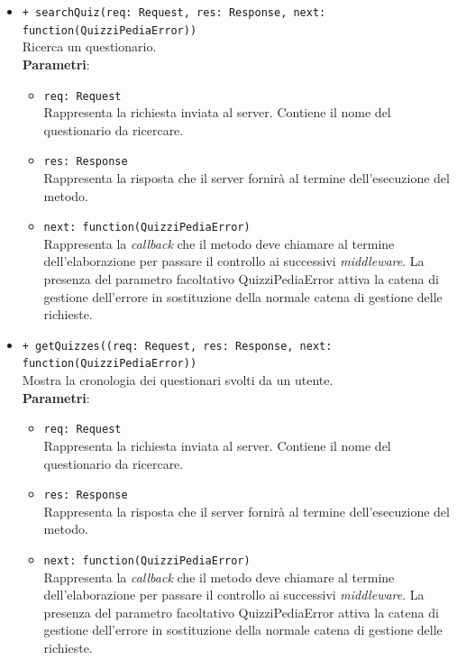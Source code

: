 \begin{itemize}
\begin{itemize}
		\item \texttt{+ searchQuiz(req: Request, res: Response, next: function(QuizziPediaError))}\\
		Ricerca un questionario.\\
		\textbf{Parametri}:
		\begin{itemize}
			\item \texttt{req: Request}\\
			Rappresenta la richiesta inviata al server. Contiene il nome del questionario da ricercare.
			\item \texttt{res: Response}\\
			Rappresenta la risposta che il server fornirà al termine dell'esecuzione del metodo.
			\item \texttt{next: function(QuizziPediaError)}\\
			Rappresenta la \textit{callback} che il metodo deve chiamare al termine dell'elaborazione per passare il controllo ai successivi \textit{middleware}. La presenza del parametro facoltativo QuizziPediaError attiva la catena di gestione dell'errore in sostituzione della normale catena di gestione delle richieste.
		\end{itemize}
		
		\item \texttt{+ getQuizzes((req: Request, res: Response, next: function(QuizziPediaError))}\\
			Mostra la cronologia dei questionari svolti da un utente.\\
			\textbf{Parametri}:
			\begin{itemize}
				\item \texttt{req: Request}\\
			Rappresenta la richiesta inviata al server. Contiene il nome del questionario da ricercare.
				\item \texttt{res: Response}\\
			Rappresenta la risposta che il server fornirà al termine dell'esecuzione del metodo.
				\item \texttt{next: function(QuizziPediaError)}\\
			Rappresenta la \textit{callback} che il metodo deve chiamare al termine dell'elaborazione per passare il controllo ai successivi \textit{middleware}. La presenza del parametro facoltativo QuizziPediaError attiva la catena di gestione dell'errore in sostituzione della normale catena di gestione delle richieste.
			\end{itemize}
		
	\end{itemize}		
\end{itemize}